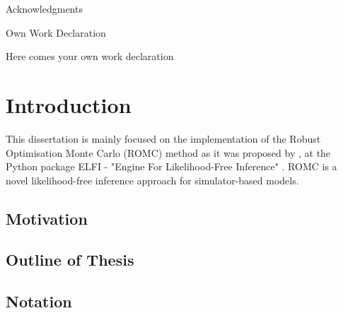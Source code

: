 \documentclass[11pt,twoside]{article}
\numberwithin{Theorem}{section}
\numberwithin{Definition}{section}
\numberwithin{Lemma}{section}
\numberwithin{Algorithm}{section}
\numberwithin{equation}{section}
\begin{document}
\begin{center}
\Large{Acknowledgments}
\end{center}


\clearpage

\begin{center}
\Large{Own Work Declaration}
\end{center}

Here comes your own work declaration

\cleardoublepage



\pagestyle{plain}
\setcounter{page}{1}

\tableofcontents
\clearpage
\listoftables
\listoffigures
\cleardoublepage

\setcounter{page}{1}

\nocite{*}

\clearpage
\section{Introduction}
\label{sec:introduction}
This dissertation is mainly focused on the implementation of the
Robust Optimisation Monte Carlo (ROMC) method as it was proposed by
\autocite{Ikonomov2019}, at the Python package ELFI - "Engine For
Likelihood-Free Inference" \autocite{1708.00707}. ROMC is a novel
likelihood-free inference approach for simulator-based models.

\subsection{Motivation}
\label{subsec:motivation}
% 


\subsection{Outline of Thesis}
\label{subsec:outline-of-thesis}
% 


\subsection{Notation}
\label{subsec:notation}
% 

\end{document}
